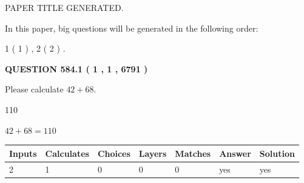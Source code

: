 \documentclass[12pt]{article}
\begin{document}
   
   
   
   
   
 \vspace{0.2in}
 
 
 
 
   
   
 PAPER TITLE GENERATED.
   
   
   
\vspace{0.2in}
   
In this paper, big questions will be generated in the following order: 
   
   
   1 ( 1 )
 ,
   2 ( 2 )
 .
  
\vspace{0.2in}
  
{\textbf{\Large{QUESTION
584.1 
 ( 1 , 1 , 6791 )
}}}
  
  
 
Please calculate $ %
42 +  %
68 $.
 
 
 
\noindent{}
 
 

110
 
 
\noindent{}
 
 

 
 
 
\noindent{}
 
 

$ %
42 +  %
68=   %
110$
 
 
\noindent{}
 
 

 
   
   
   
   
\noindent\begin{tabular}{|l|l|l|l|l|l|l|}
 \hline
Inputs & Calculates & Choices & Layers & Matches & Answer & Solution \\ \hline
 2  & 
 1  & 
 0
  & 
 0  & 
 0  & 
  yes & 
  yes 
  \\ \hline
 \end{tabular}
   
   
   
   
\noindent{}
   
\end{document}

